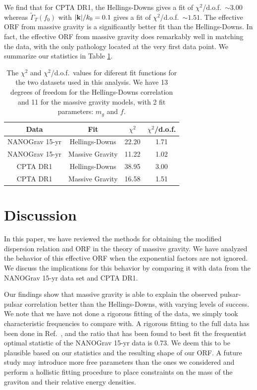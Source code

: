 \documentclass[prd,aps,psfig,nofootinbib,nobibnotes,superscriptaddress,preprintnumbers,times]{revtex4-2}\setlength{\topmargin}{-14mm}
\begin{document}
We find that for CPTA DR1, the Hellings-Downs gives a fit of $\chi^2$/d.o.f.\ $\sim 3.00$ whereas $\tilde{\Gamma}_T(f_0)$ with $|{\bf k}|/k_0 = 0.1$ gives a fit of $\chi^2$/d.o.f.\ $\sim 1.51$. The effective ORF from massive gravity is a significantly better fit than the Hellings-Downs. In fact, the effective ORF from massive gravity does remarkably well in matching the data, with the only pathology located at the very first data point.
We summarize our statistics in Table \ref{tbl:chi}. 
\begin{table}[h] 
\centering
\renewcommand{\arraystretch}{1.8}
\begin{tabular}{|c|c|c|c|}
\hline
\textbf{Data} & \textbf{Fit} & \textbf{$\chi^2$} & \textbf{$\chi^2$/d.o.f.} \\
\hline
NANOGrav 15-yr & Hellings-Downs & 22.20 & 1.71 \\
\hline
NANOGrav 15-yr & Massive Gravity & 11.22 & 1.02 \\
\hline
CPTA DR1 & Hellings-Downs & 38.95 & 3.00 \\
\hline
CPTA DR1 & Massive Gravity & 16.58 & 1.51 \\
\hline
\end{tabular}
\caption{The $\chi^2$ and $\chi^2$/d.o.f.\ values for diferent fit functions for the two datasets used in this analysis. We have 13 degrees of freedom for the Hellings-Downs correlation and 11 for the massive gravity models, with 2 fit parameters: $m_g$ and $f$. }
\label{tbl:chi}
\end{table}

\section{Discussion}\label{sec:discussion}
In this paper, we have reviewed the methods for obtaining the modified dispersion relation and ORF in the theory of massive gravity. We have analyzed the behavior of this effective ORF when the exponential factors are not ignored. We discuss the implications for this behavior by comparing it with data from the NANOGrav 15-yr data set and CPTA DR1.

Our findings show that massive gravity is able to explain the observed pulsar-pulsar correlation better than the Hellings-Downs, with varying levels of success. We note that we have not done a rigorous fitting of the data, we simply took characteristic frequencies to compare with. A rigorous fitting to the full data has been done in Ref.\ \cite{Arjona:2024cex}, and the ratio that has been found to best fit the frequentist optimal statistic of the NANOGrav 15-yr data is 0.73. We deem this to be plausible based on our statistics and the resulting shape of our ORF. A future study may introduce more free parameters than the ones we considered and perform a hollistic fitting procedure to place constraints on the mass of the graviton and their relative energy densities.
\end{document}

